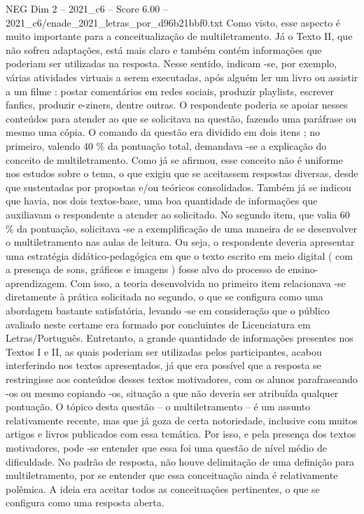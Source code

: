 \begin{textsample}{NEG Dim 2 – 2021\_c6 – Score 6.00 – 2021\_c6/enade\_2021\_letras\_por\_d96b21bbf0.txt}
Como visto, esse aspecto é muito importante para a conceitualização de multiletramento.
Já o Texto II, que não sofreu adaptações, está mais claro e também contém informações que poderiam ser utilizadas na resposta.
Nesse sentido, indicam -se, por exemplo, várias atividades virtuais a serem executadas, após alguém ler um livro ou assistir a um filme : postar comentários em redes sociais, produzir playlists, escrever fanfics, produzir e-ziners, dentre outras.
O respondente poderia se apoiar nesses conteúdos para atender ao que se solicitava na questão, fazendo uma paráfrase ou mesmo uma cópia.
O comando da questão era dividido em dois itens ; no primeiro, valendo 40 \% da pontuação total, demandava -se a explicação do conceito de multiletramento.
Como já se afirmou, esse conceito não é uniforme nos estudos sobre o tema, o que exigiu que se aceitassem respostas diversas, desde que sustentadas por propostas e/ou teóricos consolidados.
Também já se indicou que havia, nos dois textos-base, uma boa quantidade de informações que auxiliavam o respondente a atender ao solicitado.
No segundo item, que valia 60 \% da pontuação, solicitava -se a exemplificação de uma maneira de se desenvolver o multiletramento nas aulas de leitura.
Ou seja, o respondente deveria apresentar uma estratégia didático-pedagógica em que o texto escrito em meio digital ( com a presença de sons, gráficos e imagens ) fosse alvo do processo de ensino-aprendizagem.
Com isso, a teoria desenvolvida no primeiro item relacionava -se diretamente à prática solicitada no segundo, o que se configura como uma abordagem bastante satisfatória, levando -se em consideração que o público avaliado neste certame era formado por concluintes de Licenciatura em Letras/Português.
Entretanto, a grande quantidade de informações presentes nos Textos I e II, as quais poderiam ser utilizadas pelos participantes, acabou interferindo nos textos apresentados, já que era possível que a resposta se restringisse aos conteúdos desses textos motivadores, com os alunos parafraseando -os ou mesmo copiando -os, situação a que não deveria ser atribuída qualquer pontuação.
O tópico desta questão – o multiletramento – é um assunto relativamente recente, mas que já goza de certa notoriedade, inclusive com muitos artigos e livros publicados com essa temática.
Por isso, e pela presença dos textos motivadores, pode -se entender que essa foi uma questão de nível médio de dificuldade.
No padrão de resposta, não houve delimitação de uma definição para multiletramento, por se entender que essa conceituação ainda é relativamente polêmica.
A ideia era aceitar todos as conceituações pertinentes, o que se configura como uma resposta aberta.

\end{textsample}
